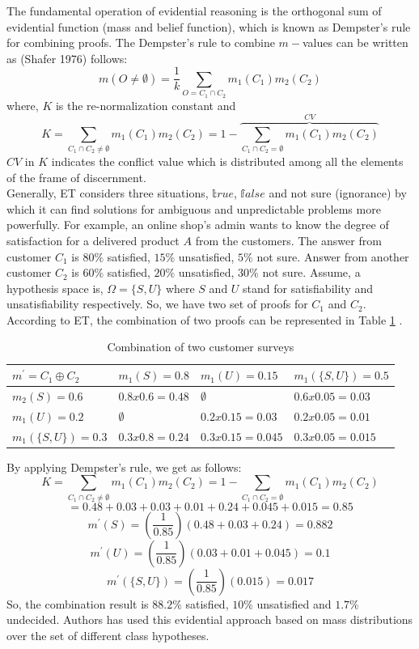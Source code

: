 The fundamental operation of evidential reasoning is the orthogonal sum of evidential function (mass and belief function), which is known as Dempster's rule for combining proofs\cite{Bell_4028391}. The Dempster's rule to combine $m-$values can be written as (Shafer 1976) follows\cite{srivastava2011introduction}:
 $$m(O \neq \emptyset) = \frac{1}{k}  \sum_{O=C_{1} \cap C_{2}} m_{1}(C_{1})m_{2}(C_{2})$$
where, $K$ is the re-normalization constant and 
$$K = \sum_{C_{1} \cap C_{2} \neq \emptyset} m_{1}(C_{1})m_{2}(C_{2}) = 1-\overbrace{ \sum_{C_{1} \cap C_{2} = \emptyset} m_{1}(C_{1})m_{2}(C_{2})}^{CV}$$
$CV$ in $K$ indicates the conflict value which is distributed among all the elements of the frame of discernment\cite{Chavez_Garcia_2016}.\\
Generally, ET considers three situations, $\mathbb true$, $\mathbb false$ and not sure (ignorance) by which it can find solutions for ambiguous and unpredictable problems more powerfully. For example, an online shop's admin wants to know the degree of satisfaction for a delivered product $A$ from the customers. The answer from customer $C_{1}$ is $80\%$ satisfied, $15\%$ unsatisfied, $5\%$ not sure. Answer from another customer $C_{2}$ is $60\%$ satisfied, $20\%$ unsatisfied, $30\%$ not sure. Assume, a hypothesis space is, $\Omega = \{S, U\}$ where $S$ and $U$ stand for satisfiability and unsatisfiability respectively. So, we have two set of proofs for $C_{1}$ and $C_{2}$. According to ET, the combination of two proofs can be represented in Table \ref{table:customer_surv} \cite{Bell_4028391}.
\begin{table}[]
\centering
\caption{Combination of two customer surveys}
\label{table:customer_surv}
\begin{tabular}{|l|l|l|l|}
\hline
 $m^{\prime}=C_{1}\oplus C_{2}$&  $m_{1}(S)=0.8$ & $m_{1}(U)=0.15$ & $m_{1}(\{S, U\})=0.5$ \\ \hline
 $m_{2}(S)=0.6$& $0.8x0.6=0.48$ & $\emptyset$ & $0.6x0.05=0.03$ \\ \hline
 $m_{1}(U)=0.2$& $\emptyset$ & $0.2x0.15=0.03$ & $0.2x0.05=0.01$ \\ \hline
 $m_{1}(\{S, U\})=0.3$& $0.3x0.8=0.24$ & $0.3x0.15=0.045$ & $0.3x0.05=0.015$ \\ \hline
\end{tabular}
\end{table}
By applying Dempster's rule, we get as follows:
$$K = \sum_{C_{1} \cap C_{2} \neq \emptyset} m_{1}(C_{1})m_{2}(C_{2}) = 1- \sum_{C_{1} \cap C_{2} = \emptyset} m_{1}(C_{1})m_{2}(C_{2})$$
$$=0.48 + 0.03 + 0.03 + 0.01 + 0.24 + 0.045 + 0.015 = 0.85$$
$$m^{\prime}(S)=(\frac{1}{0.85})(0.48 + 0.03 + 0.24) = 0.882$$
$$m^{\prime}(U)=(\frac{1}{0.85})(0.03+0.01+0.045) = 0.1$$
$$m^{\prime}(\{S, U\})=(\frac{1}{0.85})(0.015) = 0.017$$
So, the combination result is $88.2\%$ satisfied, $10\%$ unsatisfied and $1.7\%$ undecided. Authors has used this evidential approach based on mass distributions over the set of different class hypotheses\cite{Chavez_Garcia_2016}.

